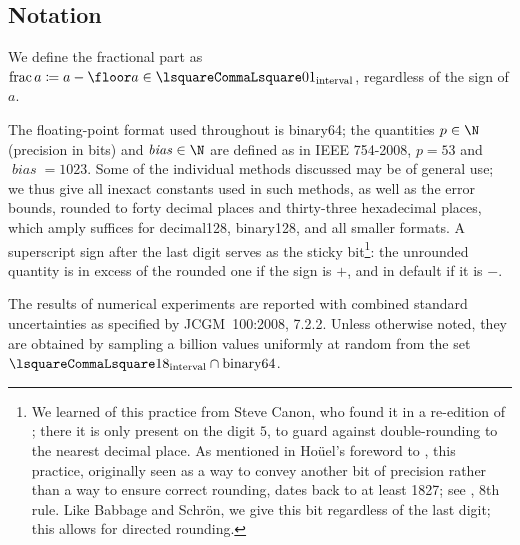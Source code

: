 ﻿\documentclass[10pt, a4paper, twoside]{basestyle}
\DeclareMathOperator{\bias}{\mathit{bias}}
\begin{document}
\subsection*{Notation}
We define the fractional part as $\FractionalPart a\DefineAs a-\Floor a\in\intclop{0}{1}$, regardless of the sign of $a$.

The floating-point format used throughout is binary64; the quantities $p\in\N$ (precision in bits) and $\bias\in\N$ are 
defined as in IEEE 754-2008, $p=53$ and $\bias=1023$.
Some of the individual methods discussed may be of general use; we thus give all inexact constants used in such methods, as well as the error bounds, rounded to forty decimal places and thirty-three
hexadecimal places, which amply suffices for decimal128, binary128, and all smaller formats. A
superscript sign after the last digit serves as the sticky bit\footnote{We learned of this practice
from Steve Canon, who found it in a re-edition of \cite[VIII]{Bruhns1870}; there it is only present
on the digit $5$, to guard against double-rounding to the nearest decimal place.
As mentioned in Hoüel's foreword to \cite[II]{Schrön1873}, this practice, originally seen as a way to
convey another bit of precision rather than a way to ensure correct rounding, dates back to at least
1827; see \cite[X]{Babbage1827}, 8th rule. Like Babbage and Schrön, we give this bit regardless of
the last digit; this allows for directed rounding.}:
the unrounded quantity is in excess of the rounded one if the sign is $+$,
and in default if it is $-$.

The results of numerical experiments are reported with combined standard uncertainties as specified by JCGM~100:2008, 7.2.2.
Unless otherwise noted, they are obtained by sampling a billion values uniformly at random from the set
$\intclop{1}{8}\Intersection\text{binary64}$.
\end{document}
